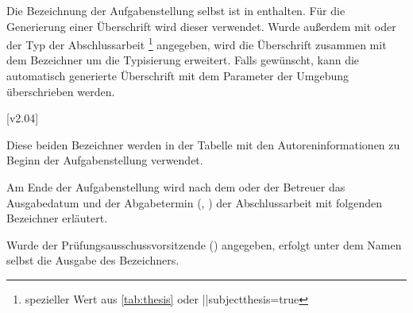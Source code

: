 \begin{DeclareEntity}{}
\begin{Declaration}
  {}
\begin{Declaration}
  {}
\printdeclarationlist

Die Bezeichnung der Aufgabenstellung selbst ist in  enthalten. 
Für die Generierung einer Überschrift wird dieser verwendet. Wurde außerdem mit 
 oder  der Typ der Abschlussarbeit%
\footnote{%
  spezieller Wert aus \autoref{tab:thesis} oder \Option||{subjectthesis=true}%
}
angegeben, wird die Überschrift zusammen mit dem Bezeichner 
um die Typisierung erweitert. Falls gewünscht, kann die automatisch generierte 
Überschrift mit dem Parameter  der Umgebung 
 überschrieben werden.
\TermTable
\end{Declaration}
\end{Declaration}

\begin{Declaration}
  {}
  [v2.04]
\begin{Declaration}
  {}
\printdeclarationlist

Diese beiden Bezeichner werden in der Tabelle mit den Autoreninformationen zu 
Beginn der Aufgabenstellung verwendet.
\TermTable
\end{Declaration}
\end{Declaration}

\begin{Declaration}
  {}
\begin{Declaration}
  {}
\printdeclarationlist

Am Ende der Aufgabenstellung wird nach dem oder der Betreuer das Ausgabedatum 
und der Abgabetermin (, ) der Abschlussarbeit 
mit folgenden Bezeichner erläutert.
\TermTable
\end{Declaration}
\end{Declaration}

\begin{Declaration}
  {}
\printdeclarationlist

Wurde der Prüfungsausschussvorsitzende () angegeben, erfolgt 
unter dem Namen selbst die Ausgabe des Bezeichners.
\TermTable
\end{Declaration}

\begin{Declaration}
  {}
\begin{Declaration}
  {}
\printdeclarationlist


\end{Declaration}
\end{Declaration}
\end{DeclareEntity}
